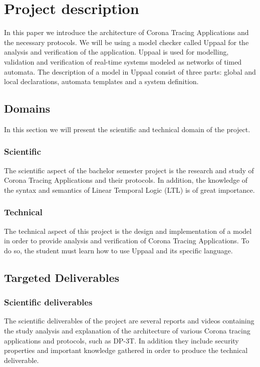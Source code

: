 \documentclass[a4paper, twocolumn]{article}
\begin{document}
\section{Project description}
In this paper we introduce the architecture of Corona Tracing Applications and the necessary protocols. We will be using a model checker called Uppaal \cite{uppaal} for the analysis and verification of the application. Uppaal is used for modelling, validation and verification of real-time systems modeled as networks of timed automata. The description of a model in Uppaal consist of three parts: global and local declarations, automata templates and a system definition.


\subsection{Domains}
In this section we will present the scientific and technical domain of the project.
\subsubsection{Scientific }
The scientific aspect of the bachelor semester project is the research and study of Corona Tracing Applications and their protocols.
In addition, the knowledge of the syntax and semantics of Linear Temporal Logic (LTL) is of great importance.
\subsubsection{Technical}
The technical aspect of this project is the design and implementation of a model in order to provide analysis and verification of Corona Tracing Applications. To do so, the student must learn how to use Uppaal and its specific language.

\subsection{Targeted Deliverables}
\label{sec-deliverables}
\subsubsection{Scientific deliverables}
The scientific deliverables of the project are several reports and videos containing the study analysis and explanation of the architecture of various Corona tracing applications and protocols, such as DP-3T. In addition they include security properties and important knowledge gathered in order to produce the technical deliverable.
\end{document}
